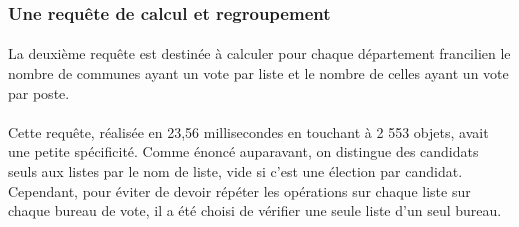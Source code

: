 \subsubsection{Une requête de calcul et regroupement}
\paragraph{}La deuxième requête est destinée à calculer pour chaque département francilien le nombre de communes ayant un vote par liste et le nombre de celles ayant un vote par poste. 

\paragraph{}Cette requête, réalisée en 23,56 millisecondes en touchant à 2 553 objets, avait une petite spécificité. Comme énoncé auparavant, on distingue des candidats seuls aux listes par le nom de liste, vide si c'est une élection par candidat. Cependant, pour éviter de devoir répéter les opérations sur chaque liste sur chaque bureau de vote, il a été choisi de vérifier une seule liste d'un seul bureau.

